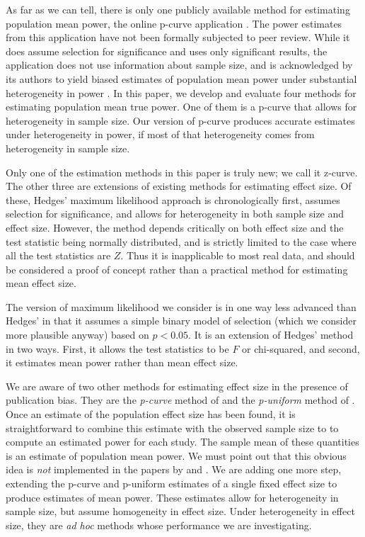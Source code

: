 \documentclass[jou]{apa6} %
\begin{document}
As far as we can tell, there is only one publicly available method for estimating population mean power, the online p-curve application \parencite{pcurveonline}. The power estimates from this application have not been formally subjected to peer review. While it does assume selection for significance and uses only significant results, the application 
does not use information about sample size, and is acknowledged by its authors to yield biased estimates of population mean power under substantial heterogeneity in power \parencite{justfine}. In this paper, 
we develop and evaluate four methods for estimating population mean true power. One of them is a p-curve that 
allows for heterogeneity in sample size. Our version of p-curve produces accurate estimates under heterogeneity in power, if most of that heterogeneity comes from heterogeneity in sample size. 

Only one of the estimation methods in this paper is truly new; we call it z-curve. The other three are extensions of existing methods for estimating effect size. Of these, Hedges' maximum likelihood approach \parencite{Hedges1992, HedgesVevea1996} is chronologically first, assumes selection for significance, and allows for heterogeneity in both sample size and effect size. However, the method depends critically on both effect size and the test statistic being normally distributed, and is strictly limited to the case where all the test statistics are $Z$. Thus it is inapplicable to most real data, and should be considered a proof of concept rather than a practical method for estimating mean effect size.

The version of maximum likelihood we consider is in one way less advanced than Hedges' in that it assumes a simple binary model of selection (which we consider more plausible anyway) based on $p<0.05$. It is an extension of Hedges' method in two ways. First, it allows the test statistics to be $F$ or chi-squared, and second, it estimates mean power rather than mean effect size.

We are aware of two other methods for estimating effect size in the presence of publication bias. They are the \emph{p-curve} method of \textcite{SimonsohnEtAl2014b} and the \emph{p-uniform} method of \textcite{vanAssenEtAl2014}. Once an estimate of the population effect size has been found, it is straightforward to combine this estimate with the observed sample size to to compute an estimated power for each study. The sample mean of these quantities is an estimate of population mean power. We must point out that this obvious idea is \emph{not} implemented in the papers by \textcite{SimonsohnEtAl2014b} and \textcite{vanAssenEtAl2014}. We are adding one more step, extending the p-curve and p-uniform estimates of a single fixed effect size to produce estimates of mean power. These estimates allow for heterogeneity in sample size, but assume homogeneity in effect size. Under heterogeneity in effect size, they are \emph{ad hoc} methods whose performance we are investigating.
\end{document}
